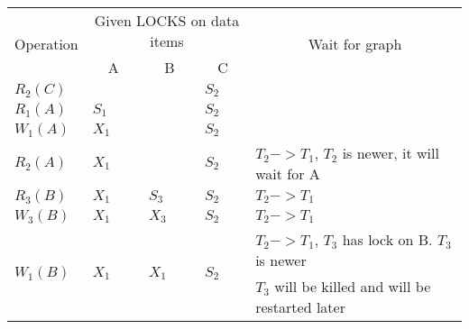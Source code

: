 \documentclass{article}
\begin{document}
\begin{enumerate}
\begin{enumerate}
        \begin{center}
            \begin{longtable}{|p{2cm}|p{1.5cm}|p{1.5cm}|p{1.5cm}|p{6.5cm}|}
                \hline
                \multicolumn{1}{|c|}{\multirow{2}{*}{Operation}} & \multicolumn{3}{c}{Given LOCKS on data items} & \multicolumn{1}{|c|}{\multirow{2}{*}{Wait for graph}} \\
                \multicolumn{1}{|c|}{} & \multicolumn{1}{c}{A} & \multicolumn{1}{c}{B} & \multicolumn{1}{c}{C} & \multicolumn{1}{|c|}{} \\ 
                \hline
                \multirow{2}{*}{$R_2(C)$} & \multirow{2}{*}{} & \multirow{2}{*}{} & \multirow{2}{*}{$S_2$} & \multirow{2}{*}{} \\
                 & & & & \\
                \hline 
                \multirow{2}{*}{$R_1(A)$} & \multirow{2}{*}{$S_1$} & \multirow{2}{*}{} & \multirow{2}{*}{$S_2$} & \multirow{2}{*}{} \\
                 & & & & \\
                \hline 
                \multirow{2}{*}{$W_1(A)$} & \multirow{2}{*}{$X_1$} & \multirow{2}{*}{} & \multirow{2}{*}{$S_2$} & \multirow{2}{*}{} \\
                 & & & & \\
                \hline 
                \multirow{2}{*}{$R_2(A)$} & \multirow{2}{*}{$X_1$} & \multirow{2}{*}{} & \multirow{2}{*}{$S_2$} & \multirow{2}{*}{$T_2 -> T_1$, $T_2$ is newer, it will wait for A} \\
                 & & & & \\
                \hline 
                \multirow{2}{*}{$R_3(B)$} & \multirow{2}{*}{$X_1$} & \multirow{2}{*}{$S_3$} & \multirow{2}{*}{$S_2$} & \multirow{2}{*}{$T_2 -> T_1$} \\
                 & & & & \\
                \hline 
                \multirow{2}{*}{$W_3(B)$} & \multirow{2}{*}{$X_1$} & \multirow{2}{*}{$X_3$} & \multirow{2}{*}{$S_2$} & \multirow{2}{*}{$T_2 -> T_1$} \\
                 & & & & \\
                \hline 
                \multirow{2}{*}{$W_1(B)$} & \multirow{2}{*}{$X_1$} & \multirow{2}{*}{$X_1$} & \multirow{2}{*}{$S_2$} & \multirow{1}{*}{$T_2 -> T_1$, $T_3$ has lock on B. $T_3$ is newer} \\
                 & & & & $T_3$ will be killed and will be restarted later \\

\end{longtable}
\end{center}
\end{enumerate}
\end{enumerate}
\end{document}
